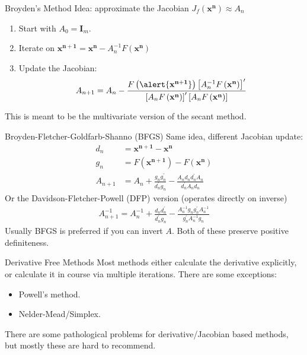 \documentclass[xcolor=pdftex,dvipsnames,table,mathserif,aspectratio=169]{beamer}
\begin{document}
\begin{frame}{Broyden's Method}
Idea: approximate the Jacobian $J_f(\mathbf{x^n}) \approx A_n$
\begin{enumerate}
\item Start with $A_0 = \mathbf{I}_m$.
\item Iterate on $\mathbf{x^{n+1}}= \mathbf{x^n} - A_n^{-1} F\left(\mathbf{x^{n}}\right)$
\item Update the Jacobian:
\begin{align*}
A_{n+1}=A_{n}-\frac{F\left(\alert{\mathbf{x^{n+1}}}\right)\left[A_{n}^{-1}  F\left(\mathbf{x^{n}}\right) \right]^{\prime}}{\left[A_{n} F\left(\mathbf{x^{n}}\right) \right]^{\prime}\left[A_{n} F\left(\mathbf{x^{n}}\right) \right]}
\end{align*}
\end{enumerate}
This is meant to be the multivariate version of the \alert{secant method}.
\end{frame} 



\begin{frame}{Broyden-Fletcher-Goldfarb-Shanno (BFGS)}
Same idea, different Jacobian update:
\begin{align*}
d_n &= \mathbf{x^{n+1}} - \mathbf{x^n} \\
g_n &= F(\mathbf{x^{n+1}}) -F(\mathbf{x^n}) \\
A_{n+1}&=A_{n}+\frac{g_{n} g_{n}^{\prime}}{d_{n}^{\prime} g_{n}}-\frac{A_{n} d_{n} d_{n}^{\prime} A_{n}}{d_{n}^{\prime} A_{n} d_{n}}
\end{align*}
Or the Davidson-Fletcher-Powell (DFP) version (operates directly on inverse)
\begin{align*}
A_{n+1}^{-1}=A_{n}^{-1}+\frac{d_{n} d_{n}^{\prime}}{d_{n}^{\prime} g_{n}}-\frac{A_{n}^{-1} g_{n} g_{n}^{\prime} A_{n}^{-1}}{g_{n}^{\prime} A_{n}^{-1} g_{n}}
\end{align*}
Usually BFGS is preferred if you can invert $A$. Both of these preserve \alert{positive definiteness}.
\end{frame} 

\begin{frame}{Derivative Free Methods}
Most methods either calculate the derivative explicitly, or calculate it in course via multiple iterations. There are some exceptions:
\begin{itemize}
\item Powell's method.
\item Nelder-Mead/Simplex.
\end{itemize}
There are some pathological problems for derivative/Jacobian based methods, but mostly these are hard to recommend.
\end{frame} 
\end{document}
